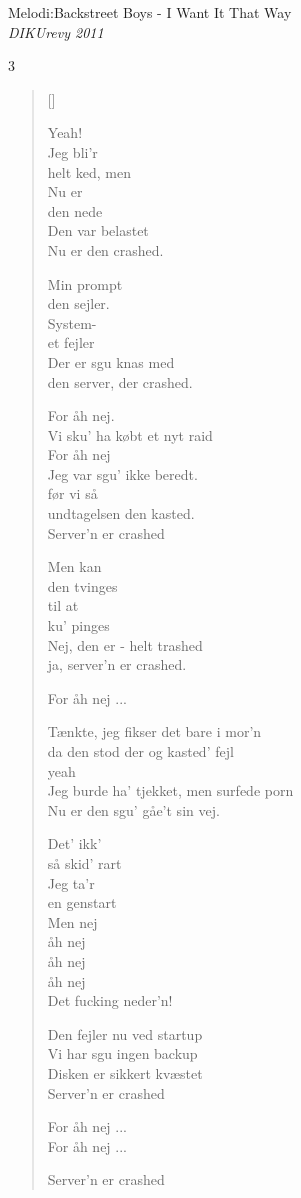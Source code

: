{Melodi:Backstreet Boys - I Want It That Way}\\[.2em]
{\small\itshape DIKUrevy 2011}
\begin{multicols}3
\settowidth{\versewidth}{Jeg burde ha' tjekket, men surfede porn}
\begin{verse}[\versewidth]

Yeah!\\
Jeg bli'r\\
helt ked, men\\
Nu er\\
den nede\\
Den var belastet\\
Nu er den crashed.

Min prompt\\
den sejler.\\
System-\\
et fejler\\
Der er sgu knas med\\
den server, der crashed.

For åh nej.\\
Vi sku' ha købt et nyt raid\\
For åh nej\\
Jeg var sgu' ikke beredt.\\
før vi så\\
undtagelsen den kasted.\\
Server'n er crashed

Men kan\\
den tvinges\\
til at\\
ku' pinges\\
Nej, den er - helt trashed\\
ja, server'n er crashed.

For åh nej ...

Tænkte, jeg fikser det bare i mor'n\\
da den stod der og kasted' fejl\\
yeah\\
Jeg burde ha' tjekket, men surfede porn\\
Nu er den sgu' gåe't sin vej.

Det' ikk'\\
så skid' rart\\
Jeg ta'r\\
en genstart\\
Men nej\\
åh nej\\
åh nej\\
åh nej\\
Det fucking neder'n!

Den fejler nu ved startup\\
Vi har sgu ingen backup\\
Disken er sikkert kvæstet\\
Server'n er crashed

For åh nej ...\\
For åh nej ...


Server'n er crashed

\end{verse}
\end{multicols}

